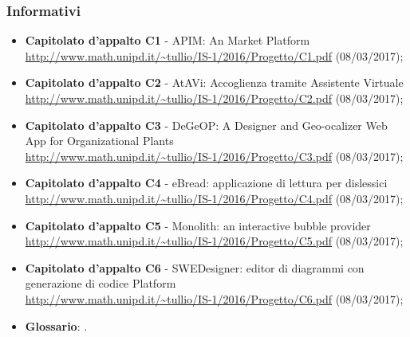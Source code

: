 \documentclass[../StudiodiFattibilita.tex]{subfiles}
\begin{document}
			\subsubsection{Informativi}
			\begin{itemize}
				\item \textbf{Capitolato d'appalto C1} - APIM: An  Market Platform\\
				\url{http://www.math.unipd.it/~tullio/IS-1/2016/Progetto/C1.pdf} (08/03/2017);
				\item \textbf{Capitolato d'appalto C2} - AtAVi: Accoglienza tramite Assistente Virtuale\\
				\url{http://www.math.unipd.it/~tullio/IS-1/2016/Progetto/C2.pdf} (08/03/2017);
				\item \textbf{Capitolato d'appalto C3} - DeGeOP: A Designer and Geo-ocalizer Web App for Organizational Plants\\ 
				\url{http://www.math.unipd.it/~tullio/IS-1/2016/Progetto/C3.pdf} (08/03/2017);
				\item \textbf{Capitolato d'appalto C4} - eBread: applicazione di lettura per dislessici \\
				\url{http://www.math.unipd.it/~tullio/IS-1/2016/Progetto/C4.pdf} (08/03/2017);
				\item \textbf{Capitolato d'appalto C5} - Monolith: an interactive bubble provider\\
				\url{http://www.math.unipd.it/~tullio/IS-1/2016/Progetto/C5.pdf} (08/03/2017);
				\item \textbf{Capitolato d'appalto C6} - SWEDesigner: editor di diagrammi  con generazione di codice Platform\\
				\url{http://www.math.unipd.it/~tullio/IS-1/2016/Progetto/C6.pdf} (08/03/2017);
				\item \textbf{Glossario}: \glossariov.
			\end{itemize}
\end{document}
